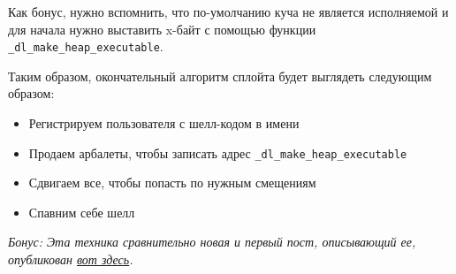\documentclass[idxtotoc,hyperref,openany,oneside]{files/pwn} %
\begin{document}
Как бонус, нужно вспомнить, что по-умолчанию куча не является исполняемой и для начала нужно выставить x-байт с помощью функции \verb|_dl_make_heap_executable|.

Таким образом, окончательный алгоритм сплойта будет выглядеть следующим образом:
\begin{itemize}
	\item Регистрируем пользователя с шелл-кодом в имени
	\item Продаем арбалеты, чтобы записать адрес \verb|_dl_make_heap_executable|
	\item Сдвигаем все, чтобы попасть по нужным смещениям
	\item Спавним себе шелл
\end{itemize}

\textit{Бонус: Эта техника сравнительно новая и первый пост, описывающий ее, опубликован \href{https://ptr-yudai.hatenablog.com/entry/2020/04/02/111507}{вот здесь}.}
\end{document}
